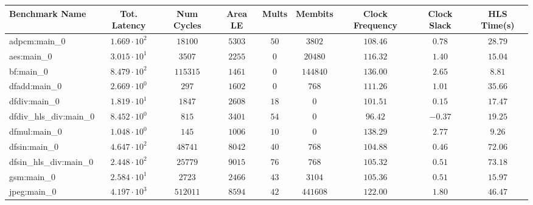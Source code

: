 \begin{tabular}{|l|c|c|c|c|c|c|c|c|}
\hline
Benchmark Name          & Tot. Latency           & Num Cycles & Area LE   & Mults   & Membits    & Clock Frequency & Clock Slack & HLS Time(s) \\
\hline
adpcm:main\_0           & $ 1.669 \cdot 10^{2} $ & $ 18100  $ & $ 5303  $ & $ 50  $ & $ 3802   $ & $ 108.46      $ & $ 0.78    $ & $ 28.79   $ \\
aes:main\_0             & $ 3.015 \cdot 10^{1} $ & $ 3507   $ & $ 2255  $ & $ 0   $ & $ 20480  $ & $ 116.32      $ & $ 1.40    $ & $ 15.04   $ \\
bf:main\_0              & $ 8.479 \cdot 10^{2} $ & $ 115315 $ & $ 1461  $ & $ 0   $ & $ 144840 $ & $ 136.00      $ & $ 2.65    $ & $ 8.81    $ \\
dfadd:main\_0           & $ 2.669 \cdot 10^{0} $ & $ 297    $ & $ 1602  $ & $ 0   $ & $ 768    $ & $ 111.26      $ & $ 1.01    $ & $ 35.66   $ \\
dfdiv:main\_0           & $ 1.819 \cdot 10^{1} $ & $ 1847   $ & $ 2608  $ & $ 18  $ & $ 0      $ & $ 101.51      $ & $ 0.15    $ & $ 17.47   $ \\
dfdiv\_hls\_div:main\_0 & $ 8.452 \cdot 10^{0} $ & $ 815    $ & $ 3401  $ & $ 54  $ & $ 0      $ & $ 96.42       $ & $ -0.37   $ & $ 19.25   $ \\
dfmul:main\_0           & $ 1.048 \cdot 10^{0} $ & $ 145    $ & $ 1006  $ & $ 10  $ & $ 0      $ & $ 138.29      $ & $ 2.77    $ & $ 9.26    $ \\
dfsin:main\_0           & $ 4.647 \cdot 10^{2} $ & $ 48741  $ & $ 8042  $ & $ 40  $ & $ 768    $ & $ 104.88      $ & $ 0.46    $ & $ 72.06   $ \\
dfsin\_hls\_div:main\_0 & $ 2.448 \cdot 10^{2} $ & $ 25779  $ & $ 9015  $ & $ 76  $ & $ 768    $ & $ 105.32      $ & $ 0.51    $ & $ 73.18   $ \\
gsm:main\_0             & $ 2.584 \cdot 10^{1} $ & $ 2723   $ & $ 2466  $ & $ 43  $ & $ 3104   $ & $ 105.36      $ & $ 0.51    $ & $ 15.97   $ \\
jpeg:main\_0            & $ 4.197 \cdot 10^{3} $ & $ 512011 $ & $ 8594  $ & $ 42  $ & $ 441608 $ & $ 122.00      $ & $ 1.80    $ & $ 46.47   $ \\

\end{tabular}
